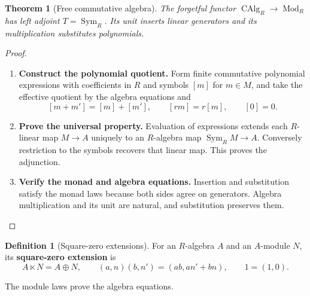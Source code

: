 \documentclass[11pt,a4paper]{article}
\numberwithin{algorithm}{section}
\numberwithin{equation}{section}
\newtheorem{theorem}{Theorem}[section]
\theoremstyle{definition}
\newtheorem{definition}[definition]{Definition}
\theoremstyle{remark}
\theoremstyle{plain}
\newcommand{\Sym}{\operatorname{Sym}}
\newcommand{\Mod}{\operatorname{Mod}}
\newcommand{\CAlg}{\operatorname{CAlg}}
\theoremstyle{definition}
\theoremstyle{plain}
\begin{document}
\begin{theorem}[Free commutative algebra]\label{thm:free-algebra}
The forgetful functor $\CAlg_R\to\Mod_R$ has left adjoint
$T=\Sym_R$. Its unit inserts linear generators and its multiplication
substitutes polynomials.
\end{theorem}
\begin{proof}\leavevmode
\begin{enumerate}[leftmargin=*,align=left]
\item \textbf{Construct the polynomial quotient.}
Form finite commutative polynomial expressions with coefficients in
$R$ and symbols $[m]$ for $m\in M$, and take the effective quotient
by the algebra equations and
\[
 [m+m']=[m]+[m'],\qquad [rm]=r[m],\qquad[0]=0.
\]

\item \textbf{Prove the universal property.}
Evaluation of expressions extends each $R$-linear map $M\to A$
uniquely to an $R$-algebra map $\Sym_R M\to A$. Conversely restriction
to the symbols recovers that linear map. This proves the adjunction.

\item \textbf{Verify the monad and algebra equations.}
Insertion and substitution satisfy the monad laws because both sides
agree on generators. Algebra multiplication and its unit are natural,
and substitution preserves them.
\end{enumerate}
\end{proof}


\begin{definition}[Square-zero extensions]\label{def:square-zero-extensions}
For an $R$-algebra $A$ and an $A$-module $N$, its \textbf{square-zero extension} is
\begin{equation}\label{eq:square-zero}
 A\ltimes N=A\oplus N,\qquad
 (a,n)(b,n')=(ab,an'+bn),\qquad 1=(1,0).
\end{equation}
\end{definition}


The module laws prove the algebra equations.
\end{document}
